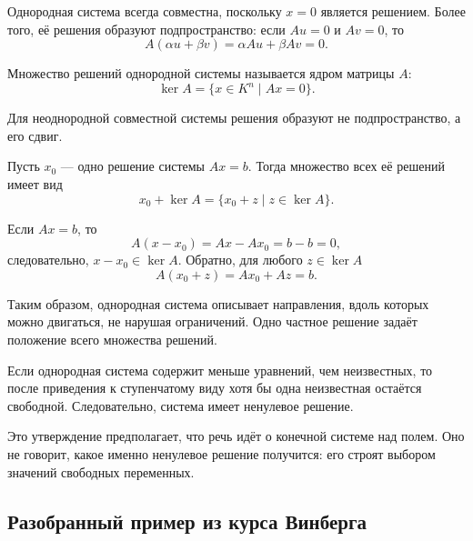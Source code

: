 Однородная система всегда совместна, поскольку \(x=0\) является решением. Более того, её решения образуют подпространство: если \(Au=0\) и \(Av=0\), то
\[
A(\alpha u+\beta v)
=
\alpha Au+\beta Av
=
0.
\]

\begin{definition}
Множество решений однородной системы называется ядром матрицы \(A\):
\[
\ker A=\{x\in K^n\mid Ax=0\}.
\]
\end{definition}

Для неоднородной совместной системы решения образуют не подпространство, а его сдвиг.

\begin{theorem}
Пусть \(x_0\) --- одно решение системы \(Ax=b\). Тогда множество всех её решений имеет вид
\[
x_0+\ker A
=
\{x_0+z\mid z\in\ker A\}.
\]
\end{theorem}

\begin{proofidea}
Если \(Ax=b\), то
\[
A(x-x_0)=Ax-Ax_0=b-b=0,
\]
следовательно, \(x-x_0\in\ker A\). Обратно, для любого \(z\in\ker A\)
\[
A(x_0+z)=Ax_0+Az=b.
\]
\end{proofidea}

Таким образом, однородная система описывает направления, вдоль которых можно двигаться, не нарушая ограничений. Одно частное решение задаёт положение всего множества решений.

\begin{corollary}
Если однородная система содержит меньше уравнений, чем неизвестных, то после приведения к ступенчатому виду хотя бы одна неизвестная остаётся свободной. Следовательно, система имеет ненулевое решение.
\end{corollary}

Это утверждение предполагает, что речь идёт о конечной системе над полем. Оно не говорит, какое именно ненулевое решение получится: его строят выбором значений свободных переменных.

\subsection{Разобранный пример из курса Винберга}

